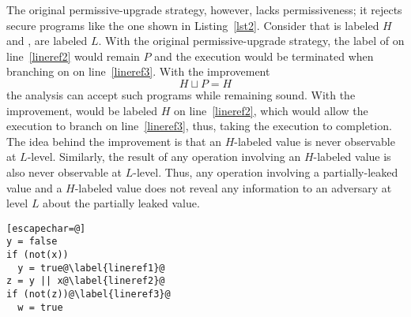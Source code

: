The original permissive-upgrade strategy, however, lacks 
permissiveness; it rejects secure programs like the one shown in
Listing~\ref{lst2}. Consider that  is labeled $H$
and ,  are labeled $L$. With the original permissive-upgrade
strategy, the label of  on
line~\ref{lineref2} would remain $P$ and the execution would be
terminated when branching on  on line~\ref{lineref3}. With the 
improvement $$H \sqcup P = H$$ the analysis can accept such programs
while remaining sound. With the improvement,  would be labeled
$H$ on line~\ref{lineref2}, which would allow the execution to branch
on line~\ref{lineref3}, thus, 
taking the execution to completion. 
The idea behind the improvement is that an $H$-labeled value is
never observable at $L$-level. Similarly, the result of any operation
involving an $H$-labeled value is also never observable at
$L$-level. Thus, any operation involving a partially-leaked value and
a $H$-labeled value does not reveal any information to an adversary at
level $L$ about the partially leaked value. 

\begin{lstlisting}[float,label=lst2,caption=Example showing the
  impermissiveness of the original permissive-upgrade strategy][escapechar=@]
y = false
if (not(x))
  y = true@\label{lineref1}@
z = y || x@\label{lineref2}@
if (not(z))@\label{lineref3}@
  w = true
\end{lstlisting}



